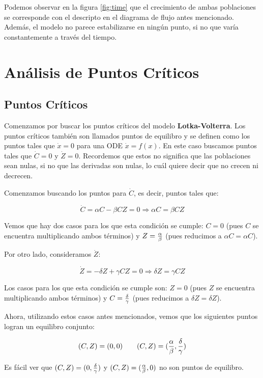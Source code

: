 \documentclass [a4paper,12pt,oneside,final]{article}
\begin{document}
Podemos observar en la figura \ref{fig:time} que el crecimiento de ambas poblaciones se corresponde con el descripto en el diagrama de flujo antes mencionado. Además, el modelo no parece estabilizarse en ningún punto, si no que varía constantemente a través del tiempo.

\section{Análisis de Puntos Críticos}

\subsection{Puntos Críticos}

Comenzamos por buscar los puntos críticos del modelo {\bf Lotka-Volterra}. Los puntos críticos también son llamados puntos de equilibro y se definen como los puntos tales que $\dot x = 0$ para una ODE $\dot x = f(x)$. En este caso buscamos puntos tales que $\dot C = 0$ y $\dot Z = 0$. Recordemos que estos no significa que las poblaciones sean nulas, si no que las derivadas son nulas, lo cuál quiere decir que no crecen ni decrecen.

Comenzamos buscando los puntos para $\dot C$, es decir, puntos tales que:

\[ \dot{C} = \alpha C - \beta C Z = 0 \Rightarrow \alpha C = \beta C Z \]

Vemos que hay dos casos para los que esta condición se cumple: $C = 0$ (pues $C$ se encuentra multiplicando ambos términos) y $Z = {\alpha \over \beta}$ (pues reducimos a $\alpha C = \alpha C$).

Por otro lado, consideramos $\dot Z$:

\[ \dot{Z} = - \delta Z + \gamma C Z = 0 \Rightarrow  \delta Z = \gamma C Z \]

Los casos para los que esta condición se cumple son: $Z = 0$ (pues $Z$ se encuentra multiplicando ambos términos) y $C = {\delta \over \gamma}$ (pues reducimos a $\delta Z = \delta Z$).

\pagebreak
Ahora, utilizando estos casos antes mencionados, vemos que los siguientes puntos logran un equilibro conjunto:

\[ (C, Z) = (0, 0) \qquad (C, Z) = ({\alpha \over \beta}, {\delta \over \gamma}) \]

Es fácil ver que $ (C, Z) = (0, {\delta \over \gamma})$ y $ (C, Z) = ({\alpha \over \beta}, 0) $ no son puntos de equilibro.
\end{document}
